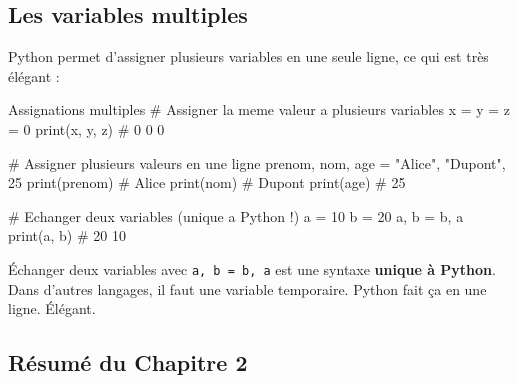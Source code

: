 \documentclass[12pt, a4paper]{article}
\begin{document}
\subsection{Les variables multiples}

Python permet d'assigner plusieurs variables en une seule ligne, ce qui est très élégant :

\begin{codeblock}{Assignations multiples}
# Assigner la meme valeur a plusieurs variables
x = y = z = 0
print(x, y, z)   # 0 0 0

# Assigner plusieurs valeurs en une ligne
prenom, nom, age = "Alice", "Dupont", 25
print(prenom)   # Alice
print(nom)      # Dupont
print(age)      # 25

# Echanger deux variables (unique a Python !)
a = 10
b = 20
a, b = b, a
print(a, b)   # 20 10
\end{codeblock}

\begin{boiteRetenir}
Échanger deux variables avec \texttt{a, b = b, a} est une syntaxe \textbf{unique à Python}. Dans d'autres langages, il faut une variable temporaire. Python fait ça en une ligne. Élégant.
\end{boiteRetenir}

\subsection{Résumé du Chapitre 2}
\end{document}
